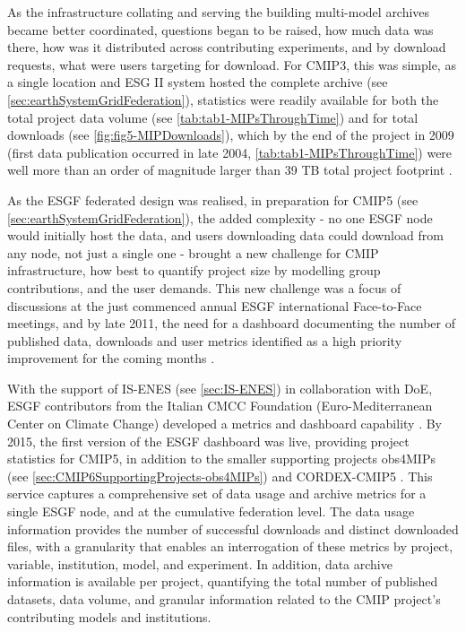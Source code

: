 \documentclass[manuscript]{copernicus}
\begin{document}
As the infrastructure collating and serving the building multi-model archives became better coordinated, questions began to be raised, how much data was there, how was it distributed across contributing experiments, and by download requests, what were users targeting for download. For CMIP3, this was simple, as a single location and ESG II system hosted the complete archive (see \autoref{sec:earthSystemGridFederation}), statistics were readily available for both the total project data volume (see \autoref{tab:tab1-MIPsThroughTime}) and for total downloads (see \autoref{fig:fig5-MIPDownloads}), which by the end of the project in 2009 (first data publication occurred in late 2004, \autoref{tab:tab1-MIPsThroughTime}) were well more than an order of magnitude larger than 39 TB total project footprint \citep[470 TB;][]{ananthakrishnan_building_2007,williams_earth_2009}.

As the ESGF federated design was realised, in preparation for CMIP5 (see \autoref{sec:earthSystemGridFederation}), the added complexity - no one ESGF node would initially host the data, and users downloading data could download from any node, not just a single one - brought a new challenge for CMIP infrastructure, how best to quantify project size by modelling group contributions, and the user demands. This new challenge was a focus of discussions at the just commenced annual ESGF international Face-to-Face meetings, and by late 2011, the need for a dashboard documenting the number of published data, downloads and user metrics identified as a high priority improvement for the coming months \citep{williams_doe_2011}.

With the support of IS-ENES (see \autoref{sec:IS-ENES}) in collaboration with DoE, ESGF contributors from the Italian CMCC Foundation (Euro-Mediterranean Center on Climate Change) developed a metrics and dashboard capability \citep[e.g.,][]{fiore_climate_2019}. By 2015, the first version of the ESGF dashboard was live, providing project statistics for CMIP5, in addition to the smaller supporting projects obs4MIPs (see \autoref{sec:CMIP6SupportingProjects-obs4MIPs}) and CORDEX-CMIP5 \citep{williams_5th_2016}. This service captures a comprehensive set of data usage and archive metrics for a single ESGF node, and at the cumulative federation level. The data usage information provides the number of successful downloads and distinct downloaded files, with a granularity that enables an interrogation of these metrics by project, variable, institution, model, and experiment. In addition, data archive information is available per project, quantifying the total number of published datasets, data volume, and granular information related to the CMIP project's contributing models and institutions.
\end{document}

